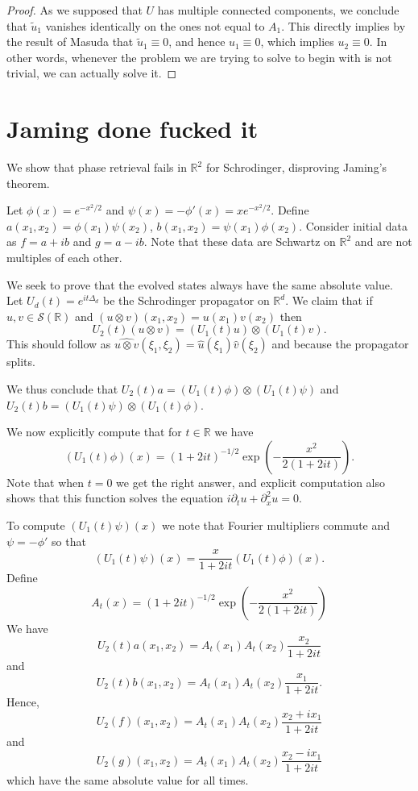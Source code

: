 \documentclass[a4paper,11pt,reqno]{amsart}
\numberwithin{equation}{section}
\theoremstyle{plain} %
\theoremstyle{definition} %
\theoremstyle{remark}
\begin{document}
\begin{proof}
As we supposed that $U$ has multiple connected components, we conclude that $\tilde{u}_1$ vanishes identically on the ones not equal to $A_1$. This directly implies by the result of Masuda that $\tilde{u}_1 \equiv 0$, and hence $u_1 \equiv 0$, which implies $u_2 \equiv 0$. In other words, whenever the problem we are trying to solve to begin with is not trivial, we can actually solve it. 

\end{proof}

\section{Jaming done fucked it}

We show that phase retrieval fails in $\mathbb{R}^2$ for Schrodinger, disproving Jaming's theorem.
\medskip

Let $\phi(x)=e^{-x^2/2}$ and $\psi(x)=-\phi'(x)=xe^{-x^2/2}.$
Define $a(x_1,x_2)=\phi(x_1)\psi(x_2)$, $b(x_1,x_2)=\psi(x_1)\phi(x_2).$ Consider initial data as $f=a+ib$ and $g=a-ib$. Note that these data are Schwartz on $\mathbb{R}^2$ and are not multiples of each other.
\medskip

 We seek to prove that the evolved states always have the same absolute value. Let $U_d(t)=e^{it\Delta_d}$ be the Schrodinger propagator on $\mathbb{R}^d$. We claim that if $u,v\in \mathcal{S}(\mathbb{R})$ and $(u\otimes v)(x_1,x_2)=u(x_1)v(x_2)$ then $$U_2(t)(u\otimes v)=(U_1(t)u)\otimes (U_1(t)v).$$
 This should follow as $\widehat{u\otimes v}(\xi_1,\xi_2)=\widehat{u}(\xi_1)\widehat{v}(\xi_2)$ and because the propagator splits.
 \medskip

 We thus conclude that $U_2(t)a=(U_1(t)\phi)\otimes (U_1(t)\psi)$ and $U_2(t)b=(U_1(t)\psi)\otimes (U_1(t)\phi)$.
 \medskip

 We now explicitly compute that for $t\in \mathbb{R}$ we have 
 $$(U_1(t)\phi)(x)=(1+2it)^{-1/2}\exp(-\frac{x^2}{2(1+2it)}).$$
 Note that when $t=0$ we get the right answer, and explicit computation also shows that this function solves the equation $i\partial_tu+\partial_x^2u=0.$
\medskip

To compute $(U_1(t)\psi)(x)$ we note that Fourier multipliers commute and $\psi=-\phi'$ so that 
$$(U_1(t)\psi)(x)=\frac{x}{1+2it} (U_1(t)\phi)(x).$$
Define
$$A_t(x)=(1+2it)^{-1/2}\exp(-\frac{x^2}{2(1+2it)})$$
We have 
$$U_2(t)a(x_1,x_2)=A_t(x_1)A_t(x_2)\frac{x_2}{1+2it} $$
and 
$$U_2(t)b(x_1,x_2)=A_t(x_1)A_t(x_2)\frac{x_1}{1+2it}. $$
Hence, 
$$U_2(f)(x_1,x_2)=A_t(x_1)A_t(x_2)\frac{x_2+ix_1}{1+2it}$$ and 
$$U_2(g)(x_1,x_2)=A_t(x_1)A_t(x_2)\frac{x_2-ix_1}{1+2it}$$ 
which have the same absolute value for all times.

 \printbibliography
\end{document}
